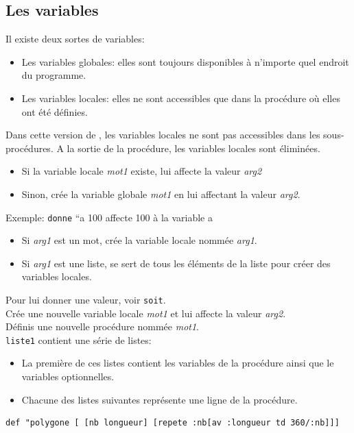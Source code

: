 \subsection{Les variables } 
Il existe deux sortes de variables:
\begin{itemize}
\item Les variables globales: elles sont toujours disponibles à n'importe
quel endroit du programme.
\item Les variables locales: elles ne sont accessibles que dans la procédure
où elles ont été définies.
\end{itemize}
Dans cette version de \logo, les variables locales ne sont pas accessibles
dans les sous-procédures. A la sortie de la procédure, les variables
locales sont éliminées.\\
\begin{itemize}
 \item Si la variable locale \textit{mot1} existe, lui affecte la valeur \textit{arg2}
 \item  Sinon, crée la variable globale \textit{mot1} en lui affectant la valeur \textit{arg2}.
\end{itemize}
 Exemple: \texttt{donne} {}``a 100 affecte 100 à la variable a\\
\begin{itemize}
 \item Si \textit{arg1} est un mot, crée la variable locale nommée \textit{arg1}.
 \item Si \textit{arg1} est une liste, se sert de tous les éléments de la liste pour créer des variables locales.
\end{itemize}
Pour lui donner une valeur, voir \texttt{soit}. \\
 Crée une nouvelle variable locale \textit{mot1} et lui affecte la valeur \textit{arg2}.\\
Définis une nouvelle procédure nommée \textit{mot1}.\\
\texttt{liste1} contient une série de listes:
\begin{itemize}
 \item La première de ces listes contient les variables de la procédure ainsi que le variables optionnelles.
 \item Chacune des listes suivantes représente une ligne de la procédure.
\end{itemize}
\begin{verbatim}
def "polygone [ [nb longueur] [repete :nb[av :longueur td 360/:nb]]]
\end{verbatim}
